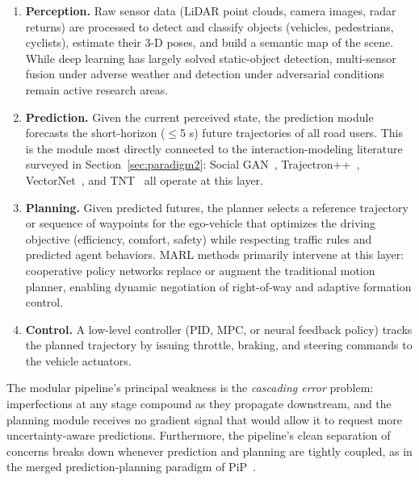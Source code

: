 \documentclass[12pt, a4paper]{article}
\begin{document}
\begin{enumerate}[leftmargin=*, label=\textbf{(\arabic*)}]
  \item \textbf{Perception.}
        Raw sensor data (LiDAR point clouds, camera images, radar returns)
        are processed to detect and classify objects (vehicles, pedestrians,
        cyclists), estimate their 3-D poses, and build a semantic map of the
        scene.  While deep learning has largely solved static-object detection,
        multi-sensor fusion under adverse weather and detection under adversarial
        conditions remain active research areas.

  \item \textbf{Prediction.}
        Given the current perceived state, the prediction module forecasts
        the short-horizon ($\leq$5 s) future trajectories of all road users.
        This is the module most directly connected to the interaction-modeling
        literature surveyed in Section~\ref{sec:paradigm2}: Social
        GAN~\cite{gupta2018social}, Trajectron++~\cite{salzmann2020trajectron},
        VectorNet~\cite{gao2020vectornet}, and TNT~\cite{zhao2020tnt} all
        operate at this layer.

  \item \textbf{Planning.}
        Given predicted futures, the planner selects a reference trajectory
        or sequence of waypoints for the ego-vehicle that optimizes the driving
        objective (efficiency, comfort, safety) while respecting traffic rules
        and predicted agent behaviors.  MARL methods primarily intervene at this
        layer: cooperative policy networks replace or augment the traditional
        motion planner, enabling dynamic negotiation of right-of-way and
        adaptive formation control.

  \item \textbf{Control.}
        A low-level controller (PID, MPC, or neural feedback policy) tracks the
        planned trajectory by issuing throttle, braking, and steering commands
        to the vehicle actuators.
\end{enumerate}

The modular pipeline's principal weakness is the \emph{cascading error}
problem: imperfections at any stage compound as they propagate downstream, and
the planning module receives no gradient signal that would allow it to request
more uncertainty-aware predictions.  Furthermore, the pipeline's clean
separation of concerns breaks down whenever prediction and planning are tightly
coupled, as in the merged prediction-planning paradigm of PiP~\cite{song2020pip}.
\end{document}
